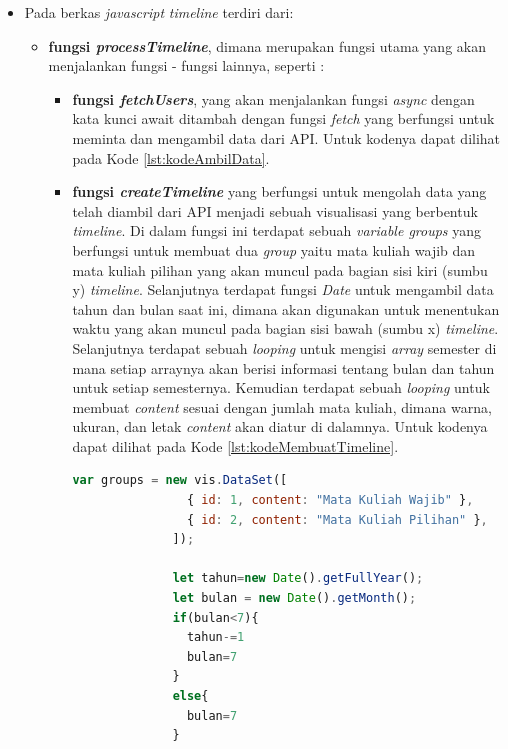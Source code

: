 \begin{itemize}
    \item Pada berkas \textit{javascript} \textit{timeline} terdiri dari: 
    \begin{itemize}
        \item \textbf{fungsi \textit{processTimeline}}, dimana merupakan fungsi utama yang akan menjalankan fungsi - fungsi lainnya, seperti :
        \begin{itemize}
            \item \textbf{fungsi \textit{fetchUsers}}, yang akan menjalankan fungsi \textit{async} dengan kata kunci await ditambah dengan fungsi \textit{fetch} yang berfungsi untuk meminta dan mengambil data dari API.
            Untuk kodenya dapat dilihat pada Kode \ref{lst:kodeAmbilData}.
            
            \item \textbf{fungsi \textit{createTimeline}} yang berfungsi untuk mengolah data yang telah diambil dari API menjadi sebuah visualisasi yang berbentuk \textit{timeline}. Di dalam fungsi ini terdapat sebuah \textit{variable groups} yang berfungsi untuk membuat dua \textit{group} yaitu mata kuliah wajib dan mata kuliah pilihan yang akan muncul pada bagian sisi kiri (sumbu y) \textit{timeline}. Selanjutnya terdapat fungsi \textit{Date} untuk mengambil data tahun dan bulan saat ini, dimana akan digunakan untuk menentukan waktu yang akan muncul pada bagian sisi bawah (sumbu x) \textit{timeline}. Selanjutnya terdapat sebuah \textit{looping} untuk mengisi \textit{array} semester di mana setiap arraynya akan berisi informasi tentang bulan dan tahun untuk setiap semesternya. Kemudian terdapat sebuah \textit{looping} untuk membuat \textit{content} sesuai dengan jumlah mata kuliah, dimana warna, ukuran, dan letak \textit{content} akan diatur di dalamnya. Untuk kodenya dapat dilihat pada Kode \ref{lst:kodeMembuatTimeline}.
            
            \begin{lstlisting}[language=JavaScript, caption=Kode untuk membuat Visualisasi Network\label{lst:kodeMembuatTimeline}]
              var groups = new vis.DataSet([
                { id: 1, content: "Mata Kuliah Wajib" },
                { id: 2, content: "Mata Kuliah Pilihan" },
              ]);
        
              let tahun=new Date().getFullYear();
              let bulan = new Date().getMonth();
              if(bulan<7){
                tahun-=1
                bulan=7
              }
              else{
                bulan=7
              }
        

\end{lstlisting}
\end{itemize}
\end{itemize}
\end{itemize}
